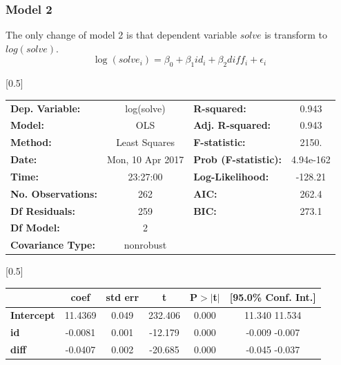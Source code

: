 \documentclass{beamer}
\begin{document}
\begin{frame}

\frametitle{Model 2}


The only change of model 2 is that dependent variable $solve$ is transform to $log(solve)$.
$$
\log(solve_i) = \beta_0 + \beta_1 id_i + \beta_2 diff_i + \epsilon_i
$$

\begin{center}
\scalebox{0.5}[0.5]{
\begin{tabular}{lclc}
\toprule
\textbf{Dep. Variable:}    &    log(solve)    & \textbf{  R-squared:         } &     0.943  \\
\textbf{Model:}            &       OLS        & \textbf{  Adj. R-squared:    } &     0.943  \\
\textbf{Method:}           &  Least Squares   & \textbf{  F-statistic:       } &     2150.  \\
\textbf{Date:}             & Mon, 10 Apr 2017 & \textbf{  Prob (F-statistic):} & 4.94e-162  \\
\textbf{Time:}             &     23:27:00     & \textbf{  Log-Likelihood:    } &   -128.21  \\
\textbf{No. Observations:} &         262      & \textbf{  AIC:               } &     262.4  \\
\textbf{Df Residuals:}     &         259      & \textbf{  BIC:               } &     273.1  \\
\textbf{Df Model:}         &           2      & \textbf{                     } &            \\
\textbf{Covariance Type:}  &    nonrobust     & \textbf{                     } &            \\
\bottomrule
\end{tabular}
}
\scalebox{0.5}[0.5]{
\begin{tabular}{lccccc}
\toprule
                   & \textbf{coef} & \textbf{std err} & \textbf{t} & \textbf{P$>$$|$t$|$} & \textbf{[95.0\% Conf. Int.]}  \\
\midrule
\textbf{Intercept} &      11.4369  &        0.049     &   232.406  &         0.000        &        11.340    11.534       \\
\textbf{id}        &      -0.0081  &        0.001     &   -12.179  &         0.000        &        -0.009    -0.007       \\
\textbf{diff}      &      -0.0407  &        0.002     &   -20.685  &         0.000        &        -0.045    -0.037       \\
\bottomrule

\end{tabular}}
\end{center}
\end{frame}
\end{document}
